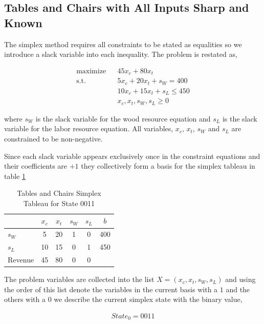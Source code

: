 \subsection{Tables and Chairs with All Inputs Sharp and Known}

The simplex method requires all constraints to be stated as equalities
so we introduce a slack variable into each inequality. The problem is
restated as,

\begin{align*}
\text{maximize} && 45 x_c + 80 x_t\\
\text{s.t.}     && 5 x_c + 20 x_t + s_W = 400\\
                && 10 x_c + 15 x_t + s_L\le 450\\
                && x_c, x_t, s_W, s_L \ge 0
\end{align*}

where $s_W$ is the slack variable for the wood resource equation and
$s_L$ is the slack variable for the labor resource equation. All
variables, $x_c$, $x_t$, $s_W$ and $s_L$ are constrained to be
non-negative.

Since each slack variable appears exclusively once in the constraint
equations and their coefficients are $+1$ they collectively form a
basis for the simplex tableau in table \ref{tab:tc0011}

\begin{table}
\centering
\begin{tabular}{| l | c c c c | c |}
\hline
        & $x_c$ & $x_t$ & $s_W$ & $s_L$ & $b$\\
\hline
$s_W$   & 5     & 20    & 1     & 0     & 400\\
$s_L$   & 10    & 15    & 0     & 1     & 450\\
\hline
Revenue & 45    & 80    & 0     & 0     &\\
\hline
\end{tabular}
  \caption[Tables and Chairs Simplex Tableau for State 0011]
          {Tables and Chairs Simplex Tableau for State 0011}
  \label{tab:tc0011}
\end{table}


The problem variables are collected into the list $X = (x_c, x_t, s_W,
s_L)$ and using the order of this list denote the variables in the
current basis with a $1$ and the others with a $0$ we describe the
current simplex state with the binary value,

\begin{align*}
State_0 = 0011
\end{align*}

